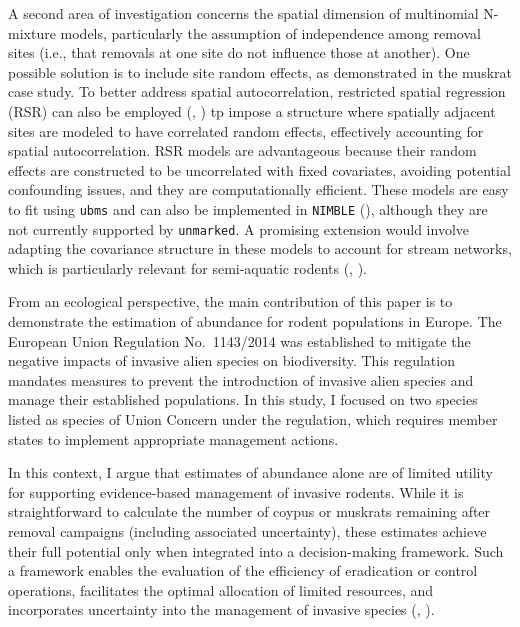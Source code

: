 \documentclass[
  11pt,
  a4paper,
]{article}
\begin{document}
A second area of investigation concerns the spatial dimension of multinomial N-mixture models, particularly the assumption of independence among removal sites (i.e., that removals at one site do not influence those at another). One possible solution is to include site random effects, as demonstrated in the muskrat case study. To better address spatial autocorrelation, restricted spatial regression (RSR) can also be employed (, ) tp impose a structure where spatially adjacent sites are modeled to have correlated random effects, effectively accounting for spatial autocorrelation. RSR models are advantageous because their random effects are constructed to be uncorrelated with fixed covariates, avoiding potential confounding issues, and they are computationally efficient. These models are easy to fit using \texttt{ubms} and can also be implemented in \texttt{NIMBLE} (), although they are not currently supported by \texttt{unmarked}. A promising extension would involve adapting the covariance structure in these models to account for stream networks, which is particularly relevant for semi-aquatic rodents (, ).

From an ecological perspective, the main contribution of this paper is to demonstrate the estimation of abundance for rodent populations in Europe. The European Union Regulation No.~1143/2014 was established to mitigate the negative impacts of invasive alien species on biodiversity. This regulation mandates measures to prevent the introduction of invasive alien species and manage their established populations. In this study, I focused on two species listed as species of Union Concern under the regulation, which requires member states to implement appropriate management actions.

In this context, I argue that estimates of abundance alone are of limited utility for supporting evidence-based management of invasive rodents. While it is straightforward to calculate the number of coypus or muskrats remaining after removal campaigns (including associated uncertainty), these estimates achieve their full potential only when integrated into a decision-making framework. Such a framework enables the evaluation of the efficiency of eradication or control operations, facilitates the optimal allocation of limited resources, and incorporates uncertainty into the management of invasive species (, ).
\end{document}
